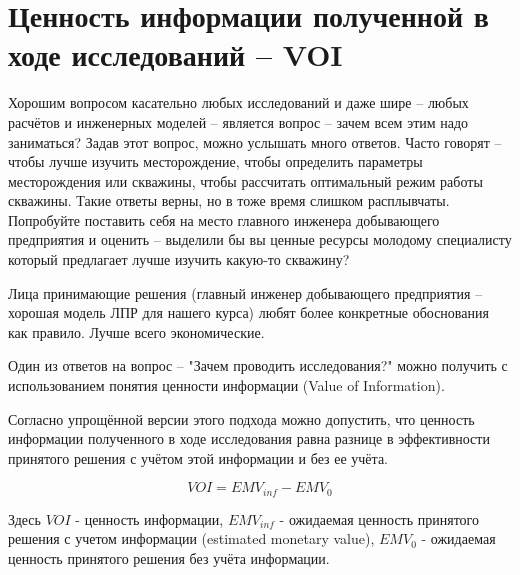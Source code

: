 
\section{Ценность информации полученной в ходе исследований -- VOI}

Хорошим вопросом касательно любых исследований и даже шире -- любых расчётов и инженерных моделей -- является вопрос -- зачем всем этим надо заниматься? Задав этот вопрос, можно услышать много ответов. Часто говорят -- чтобы лучше изучить месторождение, чтобы определить параметры месторождения или скважины, чтобы рассчитать оптимальный режим работы скважины. Такие ответы верны, но в тоже время слишком расплывчаты. Попробуйте поставить себя на место главного инженера добывающего предприятия и оценить -- выделили бы вы ценные ресурсы молодому специалисту который предлагает лучше изучить какую-то скважину? 

Лица принимающие решения (главный инженер добывающего предприятия -- хорошая модель ЛПР для нашего курса) любят более конкретные обоснования как правило. Лучше всего экономические.

Один из ответов на вопрос -- "Зачем проводить исследования?" можно получить с использованием понятия ценности информации (Value of Information). 


Согласно упрощённой версии этого подхода можно допустить, что ценность информации полученного в ходе исследования равна разнице в эффективности принятого решения с учётом этой информации и без ее учёта. 

\begin{equation}
	\label{eq:VOI}
	VOI = EMV_{inf}-EMV_{0} 
\end{equation}

Здесь $VOI$ - ценность информации, $EMV_{inf}$ - ожидаемая ценность принятого решения с учетом информации (estimated monetary value), $EMV_{0}$ - ожидаемая ценность принятого решения без учёта информации.

